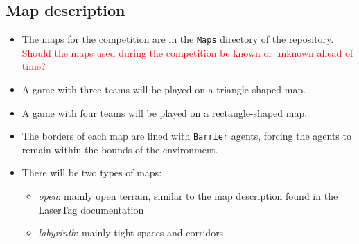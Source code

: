 \documentclass[
    a4paper,
    english,
    DIV=16,
    11pt,
    parskip=half,
]{scrartcl}
\newcommand\todo[1]{\textcolor{red}{#1}}
\begin{document}
\subsection*{Map description}
\begin{itemize}
  \item The maps for the competition are in the \texttt{Maps} directory of the repository. \todo{Should the maps used during the competition be known or unknown ahead of time?}
  \item A game with three teams will be played on a triangle-shaped map.
  \item A game with four teams will be played on a rectangle-shaped map.
  \item The borders of each map are lined with \texttt{Barrier} agents, forcing the agents to remain within the bounds of the environment.
  \item There will be two types of maps:
  \begin{itemize}
    \item \emph{open}: mainly open terrain, similar to the map description found in the LaserTag documentation
    \item \emph{labyrinth}: mainly tight spaces and corridors
  \end{itemize}
\end{itemize}
\end{document}

